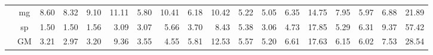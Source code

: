 \begin{table*}[]
\begin{center}
{\begin{tabular}{|c|c|rrrr|rrrr|rrrr|rrrr|}
 &  mg  &  8.60  & \cellcolor{blue!25} 8.32  &  9.10  &  11.11  &  5.80  &  10.41  & \cellcolor{blue!25}  6.18  &  10.42  &   5.22  & \cellcolor{blue!25}  5.05  &   6.35  &  14.75  &  7.95  & \cellcolor{blue!25} 5.97  &  6.88  &  21.89 \\
 &  sp  &  1.50  &  1.50  &  1.56  &   3.09  &  3.07  &   5.66  & \cellcolor{blue!25}  3.70  &   8.43  &   5.38  & \cellcolor{blue!25}  3.06  &   4.73  &  17.85  &  5.29  &  6.31  &  9.37  &  57.42 \\ \cline{2-18}
 &  GM  &  3.21  & \cellcolor{blue!25} 2.97  &  3.20  &   9.36  &  3.55  &   4.55  &   5.81  &  12.53  &   5.57  & \cellcolor{blue!25}  5.20  &   6.61  &  17.63  &  6.15  & \cellcolor{blue!25} 6.02  &  7.53  &  28.54 \\
\hline 
\end{tabular} }

\end{center}
\end{table*}
